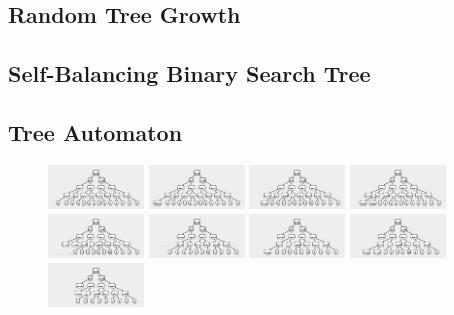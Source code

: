 \documentclass{article}
\begin{document}
\subsection{Random Tree Growth}
\subsection{Self-Balancing Binary Search Tree}
\subsection{Tree Automaton}
\begin{figure}
\begin{center}
\includegraphics[width=1in]{../board/pics/ss301.png}
\includegraphics[width=1in]{../board/pics/ss351.png}
\includegraphics[width=1in]{../board/pics/ss401.png}
\includegraphics[width=1in]{../board/pics/ss451.png}
\includegraphics[width=1in]{../board/pics/ss501.png}
\includegraphics[width=1in]{../board/pics/ss551.png}
\includegraphics[width=1in]{../board/pics/ss601.png}
\includegraphics[width=1in]{../board/pics/ss651.png}
\includegraphics[width=1in]{../board/pics/ss701.png}

\end{center}
\end{figure}
\end{document}
